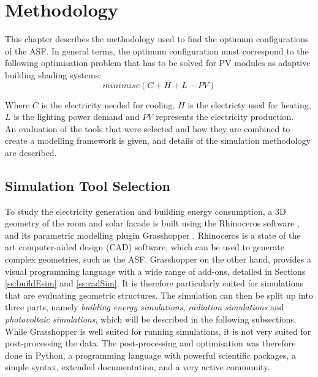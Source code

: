 \chapter{Methodology}
\label{c:methodology}
	


	This chapter describes the methodology used to find the optimum configurations of the ASF. In general terms, the optimum configuration must correspond to the following optimisation problem that has to be solved for PV modules as adaptive building shading systems:\\
	\begin{equation}
			minimise(C+H+L-PV)
	      	\label{e:minimise}
	\end{equation}

	Where $C$ is the electricity needed for cooling, $H$ is the electricty used for heating, $L$ is the lighting power demand and $PV$ represents the electricity production. \\
	An evaluation of the tools that were selected and how they are combined to create a modelling framework is given, and details of the simulation methodology are described.

	\section{Simulation Tool Selection}


		To study the electricity generation and building energy consumption, a 3D geometry of the room and solar facade is built using the Rhinoceros software \cite{Rhino}, and its parametric modelling plugin Grasshopper \cite{grasshopper}. Rhinoceros is a state of the art computer-aided design (CAD) software, which can be used to generate complex geometries, such as the ASF. Grasshopper on the other hand, provides a visual programming language with a wide range of add-ons, detailed in Sections \ref{ss:buildEsim} and \ref{ss:radSim}. It is therefore particularly suited for simulations that are evaluating geometric structures. The simulation can then be split up into three parts, namely \emph{building energy simulations}, \emph{radiation simulations} and \emph{photovoltaic simulations}, which will be described in the following subsections. While Grasshopper is well suited for running simulations, it is not very suited for post-processing the data. The post-processing and optimisation was therefore done in Python, a programming language with powerful scientific packages, a simple syntax, extended documentation, and a very active community.  %

